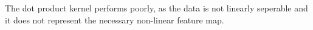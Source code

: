 \begin{answer}
    The dot product kernel performs poorly, as the data is not linearly seperable
     and it does not represent the necessary non-linear feature map.
\end{answer}
